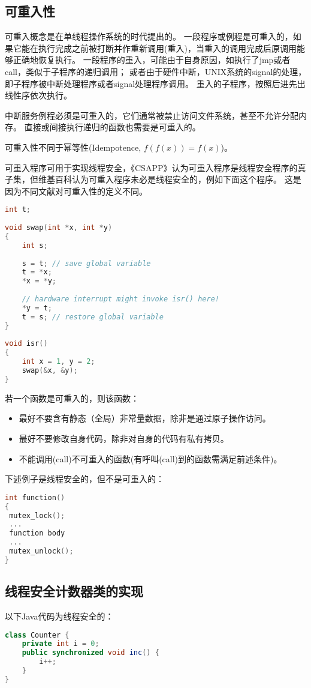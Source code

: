 \subsection{可重入性}
 可重入概念是在单线程操作系统的时代提出的。
 一段程序或例程是可重入的，如果它能在执行完成之前被打断并作重新调用(重入)，当重入的调用完成后原调用能够正确地恢复执行。
一段程序的重入，可能由于自身原因，如执行了jmp或者call，类似于子程序的递归调用；
或者由于硬件中断，UNIX系统的signal的处理，即子程序被中断处理程序或者signal处理程序调用。
重入的子程序，按照后进先出线性序依次执行。

中断服务例程必须是可重入的，它们通常被禁止访问文件系统，甚至不允许分配内存。
直接或间接执行递归的函数也需要是可重入的。

可重入性不同于幂等性(Idempotence, $f(f(x))=f(x)$)。

可重入程序可用于实现线程安全，《CSAPP》认为可重入程序是线程安全程序的真子集，但维基百科认为可重入程序未必是线程安全的，例如下面这个程序。
这是因为不同文献对可重入性的定义不同。
\begin{lstlisting}[language=C++]    
int t;
 
void swap(int *x, int *y)
{
    int s;
 
    s = t; // save global variable
    t = *x;
    *x = *y;
 
    // hardware interrupt might invoke isr() here!
    *y = t;
    t = s; // restore global variable
}
 
void isr()
{
    int x = 1, y = 2;
    swap(&x, &y);
}
\end{lstlisting}




若一个函数是可重入的，则该函数：
\begin{itemize}
\item 最好不要含有静态（全局）非常量数据，除非是通过原子操作访问。
\item 最好不要修改自身代码，除非对自身的代码有私有拷贝。
\item 不能调用(call)不可重入的函数(有呼叫(call)到的函数需满足前述条件)。
\end{itemize}


 下述例子是线程安全的，但不是可重入的：
\begin{lstlisting}[language=C++]    
int function()
{
 mutex_lock();
 ...
 function body
 ...
 mutex_unlock();
}
\end{lstlisting}

 
 
 \subsection{线程安全计数器类的实现\cite{wikipedia}}
以下Java代码为线程安全的：
\begin{lstlisting}[language=Java]  
class Counter {
    private int i = 0; 
    public synchronized void inc() {
        i++;
    }
}
\end{lstlisting}


